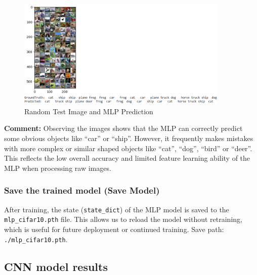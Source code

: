 \documentclass[12pt]{article}
\begin{document}
\begin{figure}[H]
    \centering
    \includegraphics[width=0.9\textwidth]{Screenshots/Ảnh chụp màn hình 2025-05-23 223320.png} %
    \caption{Random Test Image and MLP Prediction}
    \label{fig:mlp_random_predictions}
\end{figure}
\textbf{Comment:} Observing the images shows that the MLP can correctly predict some obvious objects like “car” or “ship”. However, it frequently makes mistakes with more complex or similar shaped objects like “cat”, “dog”, “bird” or “deer”. This reflects the low overall accuracy and limited feature learning ability of the MLP when processing raw images.

\subsubsection{Save the trained model (Save Model)}
After training, the state (\texttt{state\_dict}) of the MLP model is saved to the \texttt{mlp\_cifar10.pth} file. This allows us to reload the model without retraining, which is useful for future deployment or continued training. Save path: \texttt{./mlp\_cifar10.pth}.

\subsection{CNN model results}
\end{document}
